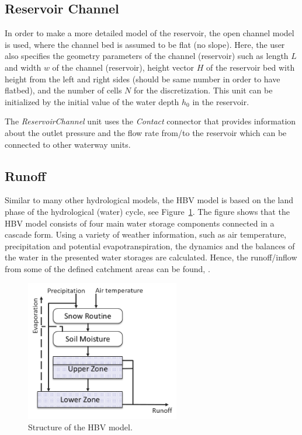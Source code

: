 \documentclass[%
]{USN-PhD}
\begin{document}
\subsection{Reservoir Channel}

In order to make a more detailed model of the reservoir, the open channel model is used, where  the channel bed is assumed to be flat (no slope). Here, the user also specifies the geometry parameters of the channel (reservoir) such as length $L$ and width $w$ of the channel (reservoir), height vector $H$ of the reservoir bed with height from the left and right sides (should be same number in order to have flatbed), and the number of cells $N$ for the discretization. This unit can be initialized by the initial value of the water depth $h_\mathrm{0}$ in the reservoir.

The \emph{ReservoirChannel} unit uses the \emph{Contact} connector that provides information about the outlet pressure and the flow rate from/to the reservoir which can be connected to other waterway units.

\subsection{Runoff}

Similar to many other hydrological models, the HBV model is based on the land phase of the hydrological (water) cycle, see Figure~\ref{fig:fig10}. The figure shows that the HBV model consists of four main water storage components connected in a cascade form. Using a variety of weather information, such as air temperature, precipitation and potential evapotranspiration, the dynamics and the balances of the water in the presented water storages are calculated. Hence, the runoff/inflow from some of the defined catchment areas can be found, \cite{Sha:13}.

\begin{figure}[!ht]
    \centering
    \includegraphics[width=0.6\textwidth]{fig/hydrology}
    \caption{Structure of the HBV model.}
    \label{fig:fig10}
\end{figure}
\end{document}
